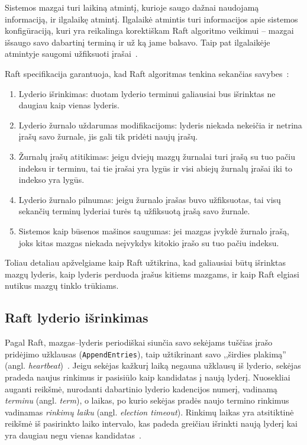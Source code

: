 \documentclass{VUMIFPSkursinis}
\begin{document}
Sistemos mazgai turi laikiną atmintį, kurioje saugo dažnai naudojamą informaciją, ir ilgalaikę atmintį. Ilgalaikė atmintis turi informacijos apie sistemos konfigūraciją, kuri yra reikalinga korektiškam Raft algoritmo veikimui -- mazgai išsaugo savo dabartinį terminą ir už ką jame balsavo. Taip pat ilgalaikėje atmintyje saugomi užfiksuoti įrašai~\cite{ongaro_consensus}.

Raft specifikacija garantuoja, kad Raft algoritmas tenkina sekančias savybes~\cite{ongaro_consensus}: 

\begin{enumerate}
\item Lyderio išrinkimas: duotam lyderio terminui galiausiai bus išrinktas ne daugiau kaip vienas lyderis.
\item Lyderio žurnalo uždarumas modifikacijoms: lyderis niekada nekeičia ir netrina įrašų savo žurnale, jis gali tik pridėti naujų įrašų.
\item Žurnalų įrašų atitikimas: jeigu dviejų mazgų žurnalai turi įrašą su tuo pačiu indeksu ir terminu, tai tie įrašai yra lygūs ir visi abiejų žurnalų įrašai iki to indekso yra lygūs.
\item Lyderio žurnalo pilnumas: jeigu žurnalo įrašas buvo užfiksuotas, tai visų sekančių terminų lyderiai turės tą užfiksuotą įrašą savo žurnale.
\item Sistemos kaip būsenos mašinos saugumas: jei mazgas įvykdė žurnalo įrašą, joks kitas mazgas niekada neįvykdys kitokio įrašo su tuo pačiu indeksu.
\end{enumerate}

Toliau detaliau apžvelgiame kaip Raft užtikrina, kad galiausiai būtų išrinktas mazgų lyderis, kaip lyderis perduoda įrašus kitiems mazgams, ir kaip Raft elgiasi nutikus mazgų tinklo trūkiams.

\subsection{Raft lyderio išrinkimas}

Pagal Raft, mazgas--lyderis periodiškai siunčia savo sekėjams tuščias įrašo pridėjimo užklausas (\texttt{AppendEntries}), taip užtikrinant savo ,,širdies plakimą'' (angl. \textit{heartbeat})~\cite{ongaro_consensus}. Jeigu sekėjas kažkurį laiką negauna užklausų iš lyderio, sekėjas pradeda naujus rinkimus ir pasisiūlo kaip kandidatas į naują lyderį. Nuosekliai auganti reikšmė, nurodanti dabartinio lyderio kadencijos numerį, vadinamą \textit{terminu} (angl. \emph{term}), o laikas, po kurio sekėjas pradės naujo termino rinkimus vadinamas \textit{rinkimų laiku} (angl. \textit{election timeout}). Rinkimų laikas yra atsitiktinė reikšmė iš pasirinkto laiko intervalo, kas padeda greičiau išrinkti naują lyderį kai yra daugiau negu vienas kandidatas~\cite{ongaro_consensus}.
\end{document}
